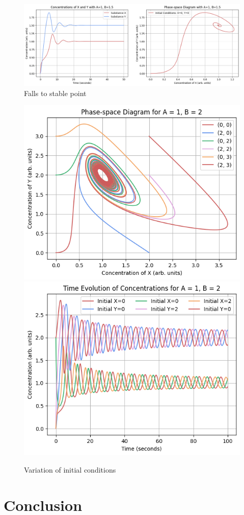\documentclass[reprint, amsmath, amssymb, aps]{revtex4-2}
\begin{document}
\begin{figure}
\includegraphics[width=2\columnwidth]{combinedPlot_fallToStable.png}
\caption{\label{fig:combinedPlot}Falls to stable point}
\end{figure}

\begin{figure}
\includegraphics[width=0.85\columnwidth]{variationOfInitialConditions_phase.png}
\includegraphics[width=0.85\columnwidth]{variationOfInitialConditions_evolution.png}
\caption{\label{fig:combinedPlot}Variation of initial conditions}
\end{figure}

\section{Conclusion}

\clearpage

\end{document}
